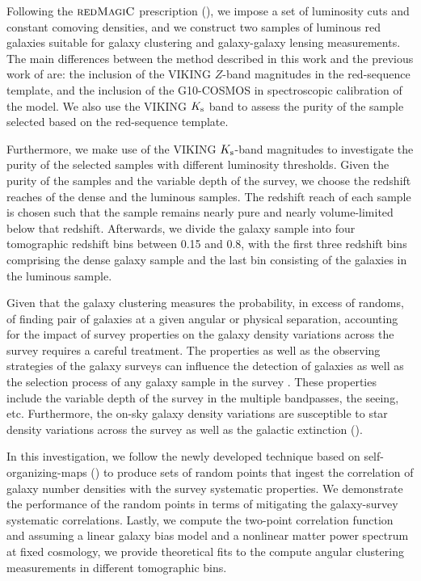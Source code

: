 \documentclass[fleqn,usenatbib,useAMS]{mnras}
\begin{document}
Following the $\textsc{redMagiC}$ prescription (\citealt{rozo2016}), we impose a set of luminosity cuts and constant comoving densities, and we construct two samples of luminous red galaxies suitable for galaxy clustering and galaxy-galaxy lensing measurements. The main differences between the method described in this work and the previous work of \citet{vakili2019} are: the inclusion of the VIKING $Z$-band magnitudes in the red-sequence template, and the inclusion of the G10-COSMOS in spectroscopic calibration of the model. We also use the VIKING $K_{\rm s}$ band to assess the purity of the sample selected based on the red-sequence template.  



Furthermore, we make use of the VIKING $K_{\rm s}$-band magnitudes to investigate the purity of the selected samples with different luminosity thresholds. Given the purity of the samples and the variable depth of the survey, we choose the redshift reaches of the dense and the luminous samples. The redshift reach of each sample is chosen such that the sample remains nearly pure and nearly volume-limited below that redshift. Afterwards, we divide the galaxy sample into four tomographic redshift bins between 0.15 and 0.8, with the first three redshift bins comprising the dense galaxy sample and the last bin consisting of the galaxies in the luminous sample. 

Given that the galaxy clustering measures the probability, in excess of randoms, of finding pair of galaxies at a given angular or physical separation, accounting for the impact of survey properties on the galaxy density variations across the survey requires a careful treatment. The properties as well as the observing strategies of the galaxy surveys can influence the detection of galaxies as well as the selection process of any galaxy sample in the survey \citep[e.g.][]{alam2017,kwan2017,ross2017,elvin2017,crocce2019,kalus2019}. These properties include the variable depth of the survey in the multiple bandpasses, the seeing, etc. Furthermore, the on-sky galaxy density variations are susceptible to star density variations across the survey as well as the galactic extinction (\citealt{ignacio2018,rezaie2019}). 

In this investigation, we follow the newly developed technique based on self-organizing-maps (\citealt{johntson2019}) to produce sets of random points that ingest the correlation of galaxy number densities with the survey systematic properties. We demonstrate the performance of the random points in terms of mitigating the galaxy-survey systematic correlations. Lastly, we compute the two-point correlation function and assuming a linear galaxy bias model and a nonlinear matter power spectrum at fixed cosmology, we provide theoretical fits to the compute angular clustering measurements in different tomographic bins. 
\end{document}
